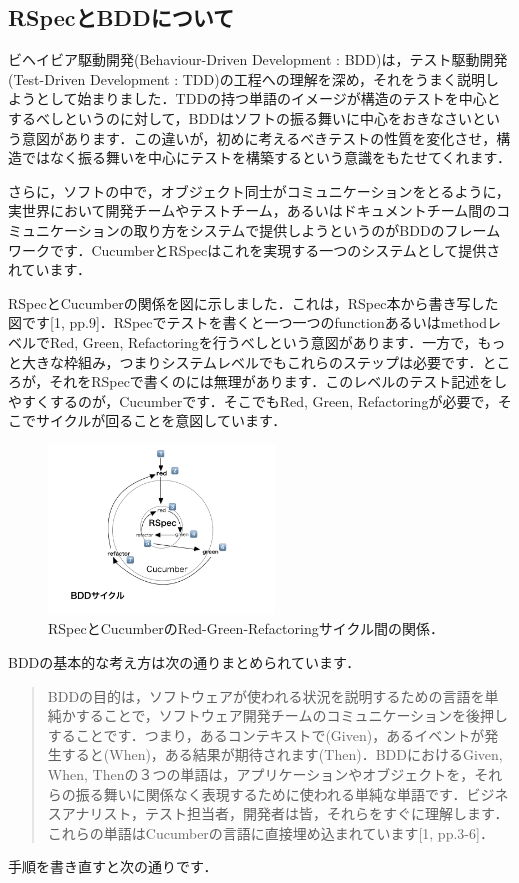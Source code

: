 
\subsection{RSpecとBDDについて}
ビヘイビア駆動開発(Behaviour-Driven Development : BDD)は，テスト駆動開発(Test-Driven Development : TDD)の工程への理解を深め，それをうまく説明しようとして始まりました．TDDの持つ単語のイメージが構造のテストを中心とするべしというのに対して，BDDはソフトの振る舞いに中心をおきなさいという意図があります．この違いが，初めに考えるべきテストの性質を変化させ，構造ではなく振る舞いを中心にテストを構築するという意識をもたせてくれます．

さらに，ソフトの中で，オブジェクト同士がコミュニケーションをとるように，実世界において開発チームやテストチーム，あるいはドキュメントチーム間のコミュニケーションの取り方をシステムで提供しようというのがBDDのフレームワークです．CucumberとRSpecはこれを実現する一つのシステムとして提供されています．

RSpecとCucumberの関係を図に示しました．これは，RSpec本から書き写した図です[1, pp.9]．RSpecでテストを書くと一つ一つのfunctionあるいはmethodレベルでRed, Green, Refactoringを行うべしという意図があります．一方で，もっと大きな枠組み，つまりシステムレベルでもこれらのステップは必要です．ところが，それをRSpecで書くのには無理があります．このレベルのテスト記述をしやすくするのが，Cucumberです．そこでもRed, Green, Refactoringが必要で，そこでサイクルが回ることを意図しています．

\begin{figure}[htbp]\begin{center}
\includegraphics[width=6cm,bb=0 0 442 500]{../figs/./my_help_nasu.001.jpg}
\caption{RSpecとCucumberのRed-Green-Refactoringサイクル間の関係．}
\label{default}\end{center}\end{figure}
BDDの基本的な考え方は次の通りまとめられています．

\begin{quotation}
BDDの目的は，ソフトウェアが使われる状況を説明するための言語を単純かすることで，ソフトウェア開発チームのコミュニケーションを後押しすることです．つまり，あるコンテキストで(Given)，あるイベントが発生すると(When)，ある結果が期待されます(Then)．BDDにおけるGiven, When, Thenの３つの単語は，アプリケーションやオブジェクトを，それらの振る舞いに関係なく表現するために使われる単純な単語です．ビジネスアナリスト，テスト担当者，開発者は皆，それらをすぐに理解します．これらの単語はCucumberの言語に直接埋め込まれています[1, pp.3-6]．

\end{quotation}
手順を書き直すと次の通りです．

